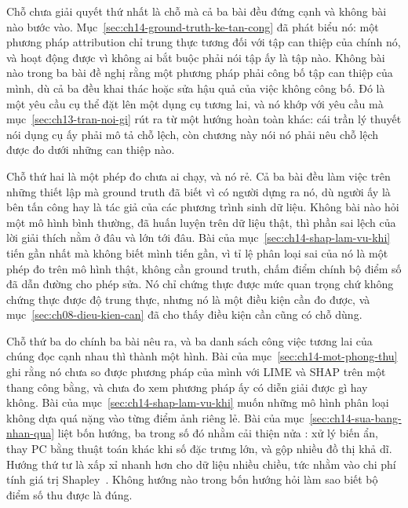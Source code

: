 %
Chỗ chưa giải quyết thứ nhất là chỗ mà cả ba bài đều đứng cạnh và không bài nào
bước vào. Mục~\ref{sec:ch14-ground-truth-ke-tan-cong} đã phát biểu nó: một
phương pháp attribution chỉ trung thực tương đối với tập can thiệp của chính
nó, và  hoạt động được vì không ai bắt buộc
phải nói tập ấy là tập nào. Không bài nào trong ba bài đề nghị rằng một phương
pháp phải công bố tập can thiệp của mình, dù cả ba đều khai thác hoặc sửa hậu
quả của việc không công bố. Đó là một yêu cầu cụ thể đặt lên một dụng cụ tương
lai, và nó khớp với yêu cầu mà mục~\ref{sec:ch13-tran-noi-gi} rút ra từ một
hướng hoàn toàn khác: cái trần lý thuyết nói dụng cụ ấy phải mô tả chỗ lệch,
còn chương này nói nó phải nêu chỗ lệch được đo dưới những can thiệp nào.

%
Chỗ thứ hai là một phép đo chưa ai chạy, và nó rẻ. Cả ba bài đều làm việc trên
những thiết lập mà ground truth đã biết vì có người dựng ra nó, dù người ấy là
bên tấn công hay là tác giả của các phương trình sinh dữ liệu. Không bài nào hỏi
một mô hình bình thường, đã huấn luyện trên dữ liệu thật, thì phần sai lệch của
lời giải thích nằm ở đâu và lớn tới đâu. Bài của
mục~\ref{sec:ch14-shap-lam-vu-khi} tiến gần nhất mà không biết mình tiến gần,
vì tỉ lệ phân loại sai của nó là một phép đo trên mô hình thật, không cần
ground truth, chấm điểm chính bộ điểm số đã dẫn đường cho phép sửa. Nó chỉ
chứng thực được mức quan trọng chứ không chứng thực được độ trung thực, nhưng
nó là một điều kiện cần đo được, và mục~\ref{sec:ch08-dieu-kien-can} đã cho
thấy điều kiện cần cũng có chỗ dùng.

%
Chỗ thứ ba do chính ba bài nêu ra, và ba danh sách công việc tương lai của
chúng đọc cạnh nhau thì thành một hình. Bài của
mục~\ref{sec:ch14-mot-phong-thu} ghi rằng nó chưa so được phương pháp của mình
với LIME và SHAP trên một thang công bằng, và chưa đo xem phương pháp ấy có
diễn giải được gì hay không. Bài của mục~\ref{sec:ch14-shap-lam-vu-khi} muốn
những mô hình phân loại không dựa quá nặng vào từng điểm ảnh riêng lẻ. Bài của
mục~\ref{sec:ch14-sua-bang-nhan-qua} liệt bốn hướng, ba trong số đó nhằm cải
thiện nửa
: xử lý biến ẩn, thay PC bằng thuật
toán khác khi số đặc trưng lớn, và gộp nhiều đồ thị khả dĩ. Hướng thứ tư là xấp
xỉ nhanh hơn cho dữ liệu nhiều chiều, tức nhằm vào chi phí tính giá trị
Shapley~\autocite{p29causalshap}. Không hướng nào trong bốn hướng hỏi làm sao
biết bộ điểm số thu được là đúng.

